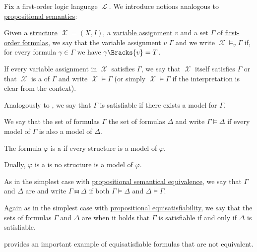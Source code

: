 \begin{definition}\label{def:first_order_semantics}
  Fix a first-order logic language \( \mscrL \). We introduce notions analogous to \hyperref[def:propositional_semantics]{propositional semantics}:
  \begin{thmenum}
     Given a \hyperref[def:first_order_structure]{structure} \( \mscrX = (X, I) \), a \hyperref[def:first_order_valuation/variable_assignment]{variable assignment} \( v \) and a set \( \Gamma \) of \hyperref[def:first_order_syntax/formula]{first-order formulas}, we say that the variable assignment \( v \)  \( \Gamma \) and we write \( \mscrX \vDash_v \Gamma \) if, for every formula \( \gamma \in \Gamma \) we have \( \gamma\Bracks{v} = T \).

    If every variable assignment in \( \mscrX \) satisfies \( \Gamma \), we say that \( \mscrX \) itself satisfies \( \Gamma \) or that \( \mscrX \) is a  of \( \Gamma \) and write \( \mscrX \vDash \Gamma \) (or simply \( \mscrX \vDash \Gamma \) if the interpretation is clear from the context).

    Analogously to , we say that \( \Gamma \) is satisfiable if there exists a model for \( \Gamma \).

     We say that the set of formulas \( \Gamma \)  the set of formulas \( \Delta \) and write \( \Gamma \vDash \Delta \) if every model of \( \Gamma \) is also a model of \( \Delta \).

     The formula \( \varphi \) is a  if every structure is a model of \( \varphi \).

     Dually, \( \varphi \) is a  is no structure is a model of \( \varphi \).

     As in the simplest case with \hyperref[def:propositional_semantics/equivalence]{propositional semantical equivalence}, we say that \( \Gamma \) and \( \Delta \) are  and write \( \Gamma \gleichstark \Delta \) if both \( \Gamma \vDash \Delta \) and \( \Delta \vDash \Gamma \).

     Again as in the simplest case with \hyperref[def:propositional_semantics/equisatisfiability]{propositional equisatisfiability}, we say that the sets of formulas \( \Gamma \) and \( \Delta \) are  when it holds that \( \Gamma \) is satisfiable if and only if \( \Delta \) is satisfiable.

     provides an important example of equisatisfiable formulas that are not equivalent.
  \end{thmenum}
\end{definition}

